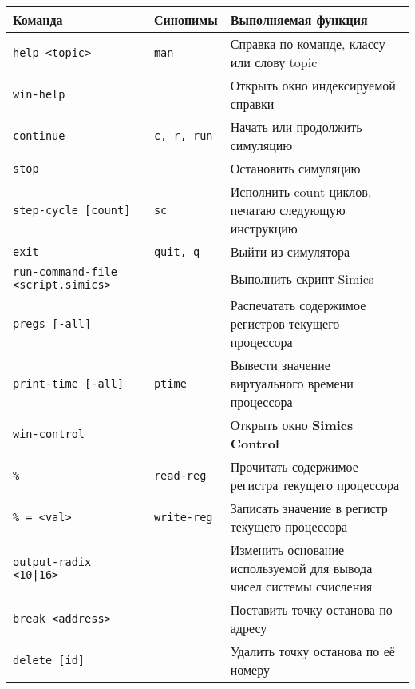 \begin{center}
\small
\begin{tabularx}{\textwidth}{Xlp{}}
\textbf{Команда}                          & \textbf{Синонимы}  & \textbf{Выполняемая функция}\\\hline
\texttt{help <topic>}                     & \texttt{man}       & Справка по команде, классу или слову topic\\
\texttt{win-help}                         &                    & Открыть окно индексируемой справки \\
\texttt{continue}                         & \texttt{c, r, run} & Начать или продолжить симуляцию\\
\texttt{stop}                             &                    & Остановить симуляцию\\
\texttt{step-cycle [count]}               & \texttt{sc}        & Исполнить count циклов, печатаю следующую инструкцию\\
\texttt{exit}                             & \texttt{quit, q}   & Выйти из симулятора\\
\texttt{run-command-file <script.simics>} &                    & Выполнить скрипт Simics\\
\texttt{pregs [-all]}                     &                    & Распечатать содержимое регистров текущего процессора\\
\texttt{print-time [-all]}                & \texttt{ptime}     & Вывести значение виртуального времени процессора\\
\texttt{win-control}                      &                    & Открыть окно \textbf{Simics Control}\\
\texttt{\%<register name>}                & \texttt{read-reg}  & Прочитать содержимое регистра текущего процессора \\
\texttt{\%<register name> = <val>}        & \texttt{write-reg} & Записать значение в регистр текущего процессора \\
\texttt{output-radix <10|16>}             &                    & Изменить основание используемой для вывода чисел системы счисления\\
\texttt{break <address>}                  &                    & Поставить точку останова по адресу \\
\texttt{delete [id]}                      &                    & Удалить точку останова по её номеру \\
\end{tabularx}

\end{center}


